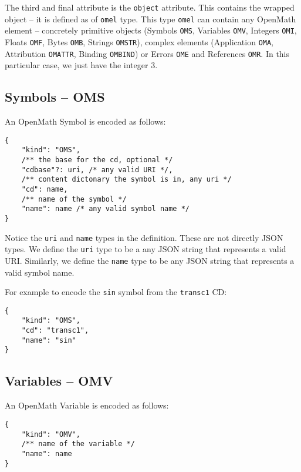The third and final attribute is the \texttt{object} attribute. 
This contains the wrapped object -- it is defined as of \texttt{omel} type. 
This type \texttt{omel} can contain any OpenMath element -- concretely
primitive objects (Symbols \texttt{OMS}, Variables \texttt{OMV}, Integers \texttt{OMI}, Floats \texttt{OMF}, Bytes \texttt{OMB}, Strings \texttt{OMSTR}), 
complex elements (Application \texttt{OMA}, Attribution \texttt{OMATTR}, Binding \texttt{OMBIND}) or
Errors \texttt{OME} and References \texttt{OMR}. 
In this particular case, we just have the integer $3$. 

\subsection{Symbols -- OMS}

An OpenMath Symbol is encoded as follows:
\\\begin{minipage}{\linewidth}
\begin{lstlisting}
{
    "kind": "OMS",
    /** the base for the cd, optional */
    "cdbase"?: uri, /* any valid URI */, 
    /** content dictonary the symbol is in, any uri */
    "cd": name,
    /** name of the symbol */
    "name": name /* any valid symbol name */
}
\end{lstlisting}\end{minipage}

Notice the \texttt{uri} and \texttt{name} types in the definition. 
These are not directly JSON types. 
We define the \texttt{uri} type to be a any JSON string that represents a valid URI. 
Similarly, we define the \texttt{name} type to be any JSON string that represents a valid symbol name. 

For example to encode the \texttt{sin} symbol from the \texttt{transc1} CD:
\\\begin{minipage}{\linewidth}
\begin{lstlisting}
{
    "kind": "OMS",
    "cd": "transc1",
    "name": "sin"
}
\end{lstlisting}\end{minipage}

\subsection{Variables -- OMV}

An OpenMath Variable is encoded as follows:
\\\begin{minipage}{\linewidth}
\begin{lstlisting}
{
    "kind": "OMV",
    /** name of the variable */
    "name": name
}
\end{lstlisting}\end{minipage}

